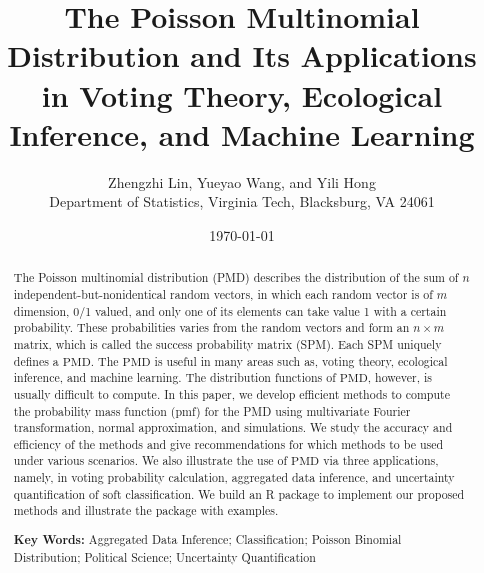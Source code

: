 \documentclass[12pt]{article}
\newcommand{\PMD}{\textrm{PMD}}
\begin{document}


\title{The Poisson Multinomial Distribution and Its Applications in Voting Theory, Ecological Inference, and Machine Learning}


\author{
Zhengzhi Lin, Yueyao Wang, and Yili Hong\\[1.5ex]
{Department of Statistics, Virginia Tech, Blacksburg, VA 24061}
}
	
\date{\today}
	
\maketitle
\begin{abstract}
The Poisson multinomial distribution (PMD) describes the distribution of the sum of $n$ independent-but-nonidentical random vectors, in which each random vector is of $m$ dimension, 0/1 valued, and only one of its elements can take value 1 with a certain probability. These probabilities varies from the random vectors and form an $n \times m$ matrix, which is called the success probability matrix (SPM). Each SPM uniquely defines a $\PMD$. The $\PMD$ is useful in many areas such as, voting theory, ecological inference, and machine learning. The distribution functions of $\PMD$, however, is usually difficult to compute. In this paper, we develop efficient methods to compute the probability mass function (pmf) for the PMD using multivariate Fourier transformation, normal approximation, and simulations. We study the accuracy and efficiency of the methods and give recommendations for which methods to be used under various scenarios. We also illustrate the use of $\PMD$ via three applications, namely, in voting probability calculation, aggregated data inference, and uncertainty quantification of soft classification. We build an R package to implement our proposed methods and illustrate the package with examples.

\textbf{Key Words:} Aggregated Data Inference; Classification; Poisson Binomial Distribution; Political Science; Uncertainty Quantification
\end{abstract}
	
\newpage
	
\end{document}
